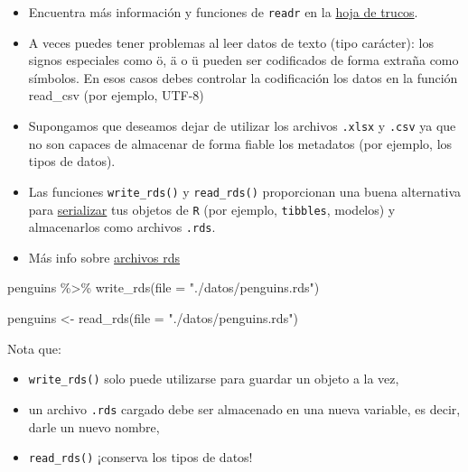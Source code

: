 \documentclass[
  letterpaper,
  DIV=11,
  numbers=noendperiod]{scrreprt}
\newenvironment{Shaded}{\begin{snugshade}}{\end{snugshade}}
\newcommand{\AttributeTok}[1]{\textcolor[rgb]{0.40,0.45,0.13}{#1}}
\newcommand{\FunctionTok}[1]{\textcolor[rgb]{0.28,0.35,0.67}{#1}}
\newcommand{\NormalTok}[1]{\textcolor[rgb]{0.00,0.23,0.31}{#1}}
\newcommand{\OtherTok}[1]{\textcolor[rgb]{0.00,0.23,0.31}{#1}}
\newcommand{\SpecialCharTok}[1]{\textcolor[rgb]{0.37,0.37,0.37}{#1}}
\newcommand{\StringTok}[1]{\textcolor[rgb]{0.13,0.47,0.30}{#1}}
\begin{document}
\begin{itemize}
\item
  Encuentra más información y funciones de \texttt{readr} en la
  \href{https://raw.githubusercontent.com/rstudio/cheatsheets/master/data-import.pdf}{hoja
  de trucos}.
\item
  A veces puedes tener problemas al leer datos de texto (tipo carácter):
  los signos especiales como ö, ä o ü pueden ser codificados de forma
  extraña como símbolos. En esos casos debes controlar la codificación
  los datos en la función read\_csv (por ejemplo, UTF-8)
\item
  Supongamos que deseamos dejar de utilizar los archivos \texttt{.xlsx}
  y \texttt{.csv} ya que no son capaces de almacenar de forma fiable los
  metadatos (por ejemplo, los tipos de datos).
\item
  Las funciones \texttt{write\_rds()} y \texttt{read\_rds()}
  proporcionan una buena alternativa para
  \href{https://en.wikipedia.org/wiki/Serialization}{serializar} tus
  objetos de \texttt{R} (por ejemplo, \texttt{tibbles}, modelos) y
  almacenarlos como archivos \texttt{.rds}.
\item
  Más info sobre
  \href{https://mgimond.github.io/ES218/Week02b.html\#Export_to_a_Rds_file}{archivos
  rds}
\end{itemize}

\begin{Shaded}
\begin{Highlighting}[]
\NormalTok{penguins }\SpecialCharTok{\%\textgreater{}\%} 
  \FunctionTok{write\_rds}\NormalTok{(}\AttributeTok{file =} \StringTok{"./datos/penguins.rds"}\NormalTok{)}
\end{Highlighting}
\end{Shaded}

\begin{Shaded}
\begin{Highlighting}[]
\NormalTok{penguins }\OtherTok{\textless{}{-}} \FunctionTok{read\_rds}\NormalTok{(}\AttributeTok{file =} \StringTok{"./datos/penguins.rds"}\NormalTok{)}
\end{Highlighting}
\end{Shaded}

Nota que:

\begin{itemize}
\item
  \texttt{write\_rds()} solo puede utilizarse para guardar un objeto a
  la vez,
\item
  un archivo \texttt{.rds} cargado debe ser almacenado en una nueva
  variable, es decir, darle un nuevo nombre,
\item
  \texttt{read\_rds()} ¡conserva los tipos de datos!
\end{itemize}
\end{document}
